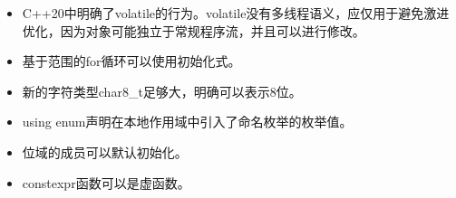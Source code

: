 \begin{tcolorbox}[breakable,enhanced jigsaw,colback=mygreen!5!white,colframe=mygreen!75!black,title={总结}]
\begin{itemize}
\item 
C++20中明确了volatile的行为。volatile没有多线程语义，应仅用于避免激进优化，因为对象可能独立于常规程序流，并且可以进行修改。

\item 
基于范围的for循环可以使用初始化式。

\item 
新的字符类型char8\_t足够大，明确可以表示8位。

\item 
using enum声明在本地作用域中引入了命名枚举的枚举值。

\item 
位域的成员可以默认初始化。

\item 
constexpr函数可以是虚函数。
\end{itemize}
\end{tcolorbox}























